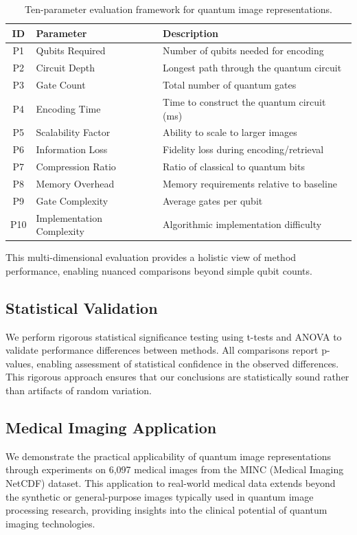 \documentclass{ipol}
\begin{document}
\begin{table}[!htbp]
\caption{Ten-parameter evaluation framework for quantum image representations.}
\label{tab:parameters}
\centering
\begin{tabular}{@{}clp{7cm}@{}}
\toprule
ID & Parameter & Description \\
\midrule
P1 & Qubits Required & Number of qubits needed for encoding \\
P2 & Circuit Depth & Longest path through the quantum circuit \\
P3 & Gate Count & Total number of quantum gates \\
P4 & Encoding Time & Time to construct the quantum circuit (ms) \\
P5 & Scalability Factor & Ability to scale to larger images \\
P6 & Information Loss & Fidelity loss during encoding/retrieval \\
P7 & Compression Ratio & Ratio of classical to quantum bits \\
P8 & Memory Overhead & Memory requirements relative to baseline \\
P9 & Gate Complexity & Average gates per qubit \\
P10 & Implementation Complexity & Algorithmic implementation difficulty \\
\bottomrule
\end{tabular}
\end{table}

This multi-dimensional evaluation provides a holistic view of method performance, enabling nuanced comparisons beyond simple qubit counts.

\subsection{Statistical Validation}

We perform rigorous statistical significance testing using t-tests and ANOVA to validate performance differences between methods. All comparisons report p-values, enabling assessment of statistical confidence in the observed differences. This rigorous approach ensures that our conclusions are statistically sound rather than artifacts of random variation.

\subsection{Medical Imaging Application}

We demonstrate the practical applicability of quantum image representations through experiments on 6,097 medical images from the MINC (Medical Imaging NetCDF) dataset. This application to real-world medical data extends beyond the synthetic or general-purpose images typically used in quantum image processing research, providing insights into the clinical potential of quantum imaging technologies.
\end{document}
